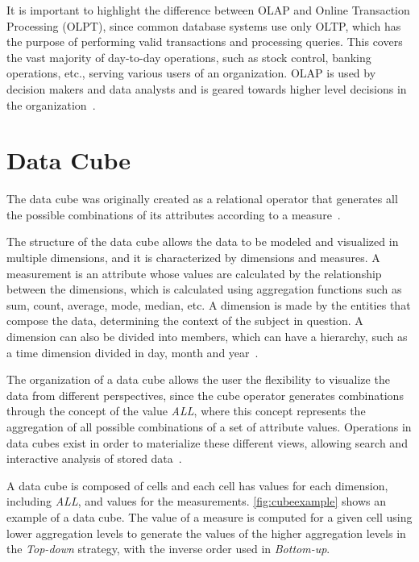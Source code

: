 It is important to highlight the difference between OLAP and Online Transaction Processing (OLPT), since common database systems use only OLTP, which has the purpose of performing valid transactions and processing queries.
This covers the vast majority of day-to-day operations, such as stock control, banking operations, etc., serving various users of an organization.
OLAP is used by decision makers and data analysts and is geared towards higher level decisions in the organization~\cite{hanDataMiningConcepts2011}.

\section{Data Cube}\label{ch:fun:cube}

The data cube was originally created as a relational operator that generates all the possible combinations of its attributes according to a measure~\cite{grayDataCubeRelational1996}.

The structure of the data cube allows the data to be modeled and visualized in multiple dimensions, and it is characterized by dimensions and measures.
A measurement is an attribute whose values are calculated by the relationship between the dimensions, which is calculated using aggregation functions such as sum, count, average, mode, median, etc.
A dimension is made by the entities that compose the data, determining the context of the subject in question.
A dimension can also be divided into members, which can have a hierarchy, such as a time dimension divided in day, month and year~\cite{hanDataMiningConcepts2011}.

The organization of a data cube allows the user the flexibility to visualize the data from different perspectives, since the cube operator generates combinations through the concept of the value \textit{ALL}, where this concept represents the aggregation of all possible combinations of a set of attribute values.
Operations in data cubes exist in order to materialize these different views, allowing search and interactive analysis of stored data~\cite{hanDataMiningConcepts2011}.

A data cube is composed of cells and each cell has values for each dimension, including \textit{ALL}, and values for the measurements.
\autoref{fig:cubeexample} shows an example of a data cube.
The value of a measure is computed for a given cell using lower aggregation levels to generate the values of the higher aggregation levels in the \textit{Top-down} strategy, with the inverse order used in \textit{Bottom-up}.

